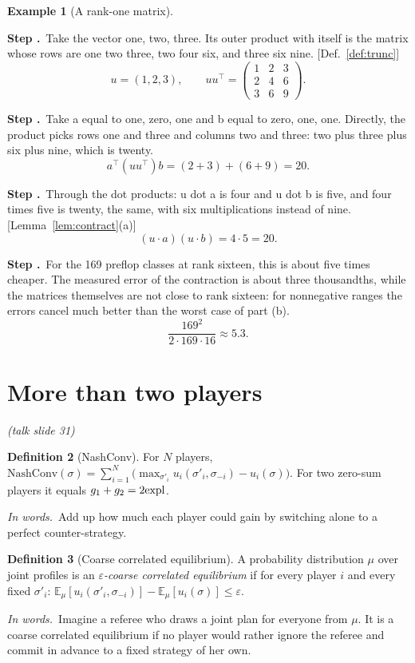 \documentclass[11pt]{article}
\theoremstyle{definition}
\newtheorem{definition}{Definition}[section]
\newtheorem{example}[definition]{Example}
\newcommand{\inwords}{\par\smallskip\noindent\textit{In words.}\ }
\newcounter{stp}
\newcommand{\steps}{\setcounter{stp}{0}}
\newcommand{\st}{\stepcounter{stp}\par\medskip\noindent\textbf{Step \arabic{stp}.}\ }
\newcommand{\by}[1]{\hfill{\small\color{blue!50!black}[#1]}}
\newcommand{\Def}[1]{Def.~\ref{#1}}\newcommand{\Lem}[1]{Lemma~\ref{#1}}\newcommand{\Thm}[1]{Thm.~\ref{#1}}
\newcommand{\slide}[1]{\hfill{\small\itshape (talk slide #1)}}
\begin{document}
\begin{example}[A rank-one matrix]\label{ex:rankone}
\steps
\st Take the vector one, two, three. Its outer product with itself is the matrix whose rows are one two three, two four six,
and three six nine. \by{\Def{def:trunc}}
\[ u=(1,2,3),\qquad uu^\top=\begin{pmatrix}1&2&3\\2&4&6\\3&6&9\end{pmatrix}. \]
\st Take a equal to one, zero, one and b equal to zero, one, one. Directly, the product picks rows one and three and
columns two and three: two plus three plus six plus nine, which is twenty.
\[ a^\top(uu^\top)b=(2+3)+(6+9)=20. \]
\st Through the dot products: u dot a is four and u dot b is five, and four times five is twenty, the same, with six
multiplications instead of nine. \by{\Lem{lem:contract}(a)}
\[ (u\cdot a)(u\cdot b)=4\cdot5=20. \]
\st For the 169 preflop classes at rank sixteen, this is about five times cheaper. The measured error of the contraction is
about three thousandths, while the matrices themselves are not close to rank sixteen: for nonnegative ranges the errors
cancel much better than the worst case of part (b).
\[ \frac{169^2}{2\cdot169\cdot16}\approx5.3. \]
\end{example}
\begin{center}\end{center}

\section{More than two players}\label{sec:multi}\slide{31}
\begin{definition}[NashConv]\label{def:nashconv}
For $N$ players, $\mathrm{NashConv}(\sigma)=\sum_{i=1}^N\big(\max_{\sigma'_i}u_i(\sigma'_i,\sigma_{-i})-u_i(\sigma)\big)$. For two zero-sum players it equals
$g_1+g_2=2\mathrm{expl}$.
\inwords Add up how much each player could gain by switching alone to a perfect counter-strategy.
\end{definition}

\begin{definition}[Coarse correlated equilibrium]\label{def:cce}
A probability distribution $\mu$ over joint profiles is an \emph{$\varepsilon$-coarse correlated equilibrium} if for every player $i$ and
every fixed $\sigma'_i$: $\mathbb E_\mu[u_i(\sigma'_i,\sigma_{-i})]-\mathbb E_\mu[u_i(\sigma)]\le\varepsilon$.
\inwords Imagine a referee who draws a joint plan for everyone from $\mu$. It is a coarse correlated equilibrium if no player
would rather ignore the referee and commit in advance to a fixed strategy of her own.
\end{definition}
\end{document}
